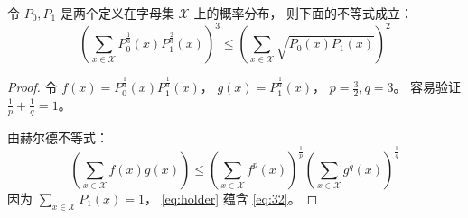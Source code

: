 \begin{lemma}\label{lem:p0p1}
    令 $P_0,P_1$ 
    是两个定义在字母集
    $\mathcal{X}$ 上的概率分布，
    则下面的不等式成立：
    \begin{equation}\label{eq:32}
        \left(\sum_{x\in \mathcal{X}}
        P^{\frac{1}{3}}_0(x)
        P^{\frac{2}{3}}_1(x)\right)^3
        \leq \left(\sum_{x\in \mathcal{X}}
        \sqrt{P_0(x) P_1(x)}\right)^2
    \end{equation}
\end{lemma}

\begin{proof}
    令 $f(x)=P^{\frac{1}{3}}_0(x)
    P^{\frac{1}{3}}_1(x)$，
    $g(x) = P^{\frac{1}{3}}_1(x)$，
    $p=\frac{3}{2}, q=3$。
    容易验证 $\frac{1}{p} + \frac{1}{q}=1$。

    由赫尔德不等式：
    \begin{equation}\label{eq:holder}
        \left(\sum_{x\in\mathcal{X}}f(x)g(x) \right)
        \leq \left(\sum_{x\in\mathcal{X}} f^p(x) \right)^{\frac{1}{p}}
        \left(\sum_{x\in\mathcal{X}} g^q(x) \right)^{\frac{1}{q}}
    \end{equation}
    因为 $\sum_{x\in\mathcal{X}} P_1(x)=1$， \eqref{eq:holder} 蕴含
    \eqref{eq:32}。
\end{proof}
    
